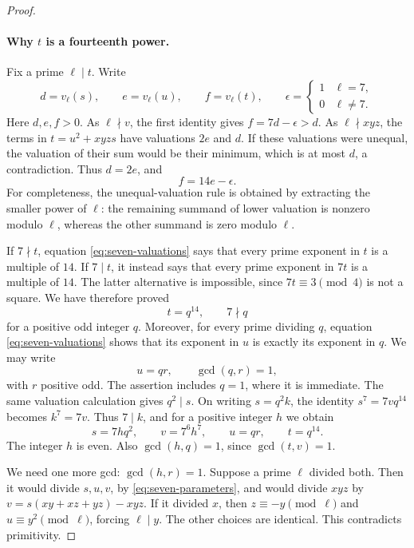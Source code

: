 \begin{proof}
\paragraph{Why $t$ is a fourteenth power.}
Fix a prime $\ell\mid t$.  Write
\[
 d=v_\ell(s),\qquad e=v_\ell(u),\qquad f=v_\ell(t),\qquad
 \epsilon=\begin{cases}1&\ell=7,\\0&\ell\ne7.\end{cases}
\]
Here $d,e,f>0$.  As $\ell\nmid v$, the first identity gives
$f=7d-\epsilon>d$.  As $\ell\nmid xyz$, the terms in
$t=u^2+xyzs$ have valuations $2e$ and $d$.  If these valuations were
unequal, the valuation of their sum would be their minimum, which is at
most $d$, a contradiction.  Thus $d=2e$, and
\begin{equation}\label{eq:seven-valuations}
 f=14e-\epsilon.
\end{equation}
For completeness, the unequal-valuation rule is obtained by extracting
the smaller power of $\ell$: the remaining summand of lower valuation is
nonzero modulo $\ell$, whereas the other summand is zero modulo $\ell$.

If $7\nmid t$, equation \eqref{eq:seven-valuations} says that every prime
exponent in $t$ is a multiple of $14$.  If $7\mid t$, it instead says that
every prime exponent in $7t$ is a multiple of $14$.  The latter alternative
is impossible, since $7t\equiv3\pmod4$ is not a square.  We have therefore
proved
\[
 t=q^{14},\qquad 7\nmid q
\]
for a positive odd integer $q$.  Moreover, for every prime dividing $q$,
equation \eqref{eq:seven-valuations} shows that its exponent in $u$ is
exactly its exponent in $q$.  We may write
\[
 u=qr,\qquad \gcd(q,r)=1,
\]
with $r$ positive odd.  The assertion includes $q=1$, where it is immediate.
The same valuation calculation gives $q^2\mid s$.  On writing $s=q^2k$,
the identity $s^7=7vq^{14}$ becomes $k^7=7v$.  Thus $7\mid k$, and for a
positive integer $h$ we obtain
\begin{equation}\label{eq:seven-parameters}
 s=7hq^2,\qquad v=7^6h^7,\qquad u=qr,\qquad t=q^{14}.
\end{equation}
The integer $h$ is even.  Also $\gcd(h,q)=1$, since $\gcd(t,v)=1$.

We need one more gcd: $\gcd(h,r)=1$.  Suppose a prime $\ell$ divided both.
Then it would divide $s,u,v$, by \eqref{eq:seven-parameters}, and would
divide $xyz$ by $v=s(xy+xz+yz)-xyz$.  If it divided $x$, then
$z\equiv-y\pmod\ell$ and $u\equiv y^2\pmod\ell$, forcing $\ell\mid y$.
The other choices are identical.  This contradicts primitivity.


\end{proof}
